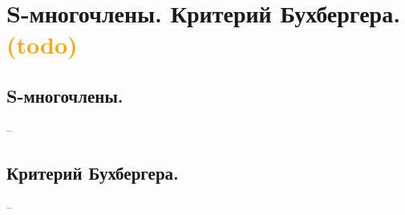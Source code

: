 \section{S-многочлены. Критерий Бухбергера. \textcolor{orange}{(todo)}}

\subsection{S-многочлены.}
--

\subsection{Критерий Бухбергера.}
--
